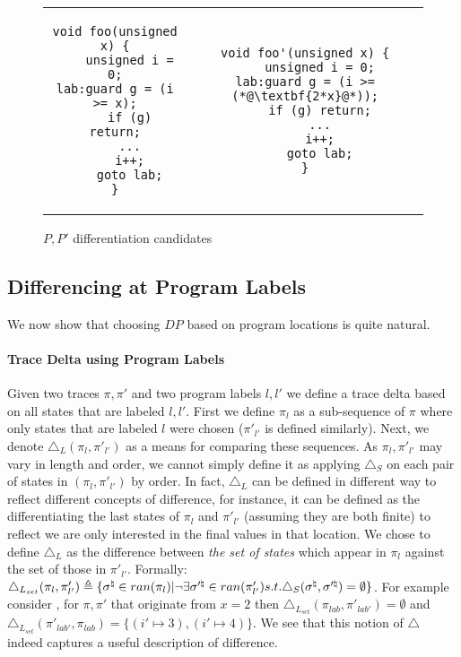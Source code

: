 \begin{figure}
\begin{tabular}{cc}
\centering
\begin{lstlisting}
void foo(unsigned x) {
    unsigned i = 0;
lab:guard g = (i >= x);
    if (g) return;
    ...
    i++;
    goto lab;
}
\end{lstlisting}
&
\begin{lstlisting}
void foo'(unsigned x) {
    unsigned i = 0;
lab:guard g = (i >= (*@\textbf{2*x}@*));
    if (g) return;
    ...
    i++;
    goto lab;
}
\end{lstlisting}
\end{tabular}
\caption{$P,P'$ differentiation candidates}
\end{figure}

\subsection{Differencing at Program Labels} 

We now show that choosing $DP$ based on program locations is quite natural.

\paragraph{Trace Delta using Program Labels} 
Given two traces $\pi,\pi'$ and two program labels $l,l'$ we define a trace delta based on all states that are labeled $l,l'$. First we define $\pi_{l}$ as a sub-sequence of $\pi$ where only states that are labeled $l$ were chosen ($\pi'_{l'}$ is defined similarly). Next, we denote $\triangle_L(\pi_{l},\pi'_{l'})$ as a means for comparing these sequences. As $\pi_{l},\pi'_{l'}$ may vary in length and order, we cannot simply define it as applying $\triangle_{S}$ on each pair of states in $(\pi_{l},\pi'_{l'})$ by order. In fact, $\triangle_{L}$ can be defined in different way to reflect different concepts of difference, for instance, it can be defined as the differentiating the last states of $\pi_{l}$ and $\pi'_{l'}$ (assuming they are both finite) to reflect we are only interested in the final values in that location. We chose to define $\triangle_{L}$ as the difference between \emph{the set of states} which appear in $\pi_{l}$ against the set of those in $\pi'_{l'}$. Formally: $\triangle_{L_{set}}(\pi_{l},\pi'_{l'}) \triangleq \{ \sigma^\natural \in ran(\pi_{l}) | \neg \exists \sigma'^\natural \in ran(\pi'_{l'}) s.t. \triangle_{S}(\sigma^\natural,\sigma'^\natural) = \emptyset \}$. For example consider , for $\pi, \pi'$ that originate from $x=2$  then $\triangle_{L_{set}}(\pi_{lab},\pi'_{lab'}) = \emptyset$ and $\triangle_{L_{set}}(\pi'_{lab'},\pi_{lab}) = \{ (i' \mapsto 3),(i' \mapsto 4) \}$. We see that this notion of $\triangle$ indeed captures a useful description of difference.

